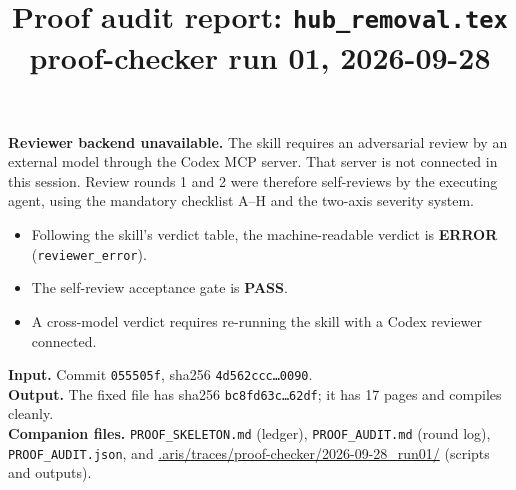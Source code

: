 \documentclass[10pt]{article}
\title{Proof audit report: \texttt{hub\_\allowbreak{}removal.tex}\\\large proof-checker run 01, 2026-09-28}
\date{}
\begin{document}
\maketitle

\begin{warn}
\textbf{Reviewer backend unavailable.} The skill requires an adversarial review by an external model through the Codex MCP server. That server is not connected in this session. Review rounds 1 and 2 were therefore self-reviews by the executing agent, using the mandatory checklist A--H and the two-axis severity system.
\begin{itemize}\itemsep0pt
\item Following the skill's verdict table, the machine-readable verdict is \textbf{ERROR} (\texttt{reviewer\_\allowbreak{}error}).
\item The self-review acceptance gate is \textbf{PASS}.
\item A cross-model verdict requires re-running the skill with a Codex reviewer connected.
\end{itemize}
\end{warn}

\noindent\textbf{Input.} Commit \texttt{055505f}, sha256 \texttt{4d562ccc\ldots0090}.\\
\textbf{Output.} The fixed file has sha256 \texttt{bc8fd63c\ldots62df}; it has 17 pages and compiles cleanly.\\
\textbf{Companion files.} \texttt{PROOF\_\allowbreak{}SKELETON.md} (ledger), \texttt{PROOF\_\allowbreak{}AUDIT.md} (round log), \texttt{PROOF\_\allowbreak{}AUDIT.json}, and \url{.aris/traces/proof-checker/2026-09-28_run01/} (scripts and outputs).
\end{document}
